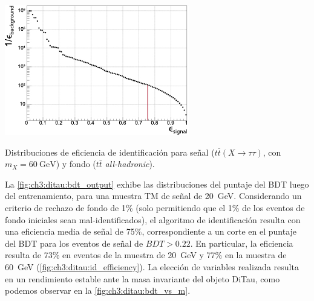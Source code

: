 \begin{marginfigure}[-7em]
    \includegraphics[width=0.99\linewidth]{Assets/Plots/DiTau/ID/efficiency_sig-vs-bkg_60GeV.pdf}
    \caption{Distribuciones de eficiencia de identificación para señal ($t\bar{t}(X \to \tau\tau)$, con $m_X = \SI{60}{\GeV}$) y fondo ($t\bar{t}$ \textit{all-hadronic}).}
    \label{fig:ch3:ditau:id_efficiency}
\end{marginfigure}

La \cref{fig:ch3:ditau:bdt_output} exhibe las distribuciones del puntaje del BDT luego del entrenamiento, para una muestra TM de señal de \SI{20}{\GeV}. Considerando un criterio de rechazo de fondo de 1\% (solo permitiendo que el 1\% de los eventos de fondo iniciales sean mal-identificados), el algoritmo de identificación resulta con una eficiencia media de señal de 75\%, correspondiente a un corte en el puntaje del BDT para los eventos de señal de $BDT > 0.22$. En particular, la eficiencia resulta de 73\% en eventos de la muestra de \SI{20}{\GeV} y 77\% en la muestra de \SI{60}{\GeV} (\cref{fig:ch3:ditau:id_efficiency}). La elección de variables realizada resulta en un rendimiento estable ante la masa invariante del objeto DiTau, como podemos observar en la \cref{fig:ch3:ditau:bdt_vs_m}.

